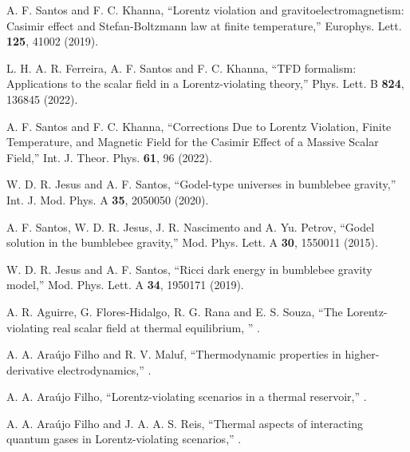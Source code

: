 \documentclass[11pt,showpacs,preprintnumbers,amsmath,amssymb,prd,nofootinbib,superscriptaddress]{revtex4-2}
\begin{document}
\begin{thebibliography}{99}
 A. F. Santos and F. C. Khanna, ``Lorentz violation and gravitoelectromagnetism: Casimir effect and Stefan-Boltzmann law at finite temperature,''  {Europhys. Lett. \textbf{125}, 41002 (2019)}.

 L. H. A. R. Ferreira, A. F. Santos and F. C. Khanna, ``TFD formalism: Applications to the scalar field in a Lorentz-violating theory,''  {Phys. Lett. B \textbf{824}, 136845 (2022)}.

 A. F. Santos and F. C. Khanna, ``Corrections Due to Lorentz Violation, Finite Temperature, and Magnetic Field for the Casimir Effect of a Massive Scalar Field,''  {Int. J. Theor. Phys. \textbf{61}, 96 (2022)}.

 W. D. R. Jesus and A. F. Santos, ``Godel-type universes in bumblebee gravity,''  {Int. J. Mod. Phys. A \textbf{35}, 2050050 (2020)}.

 A. F. Santos, W. D. R. Jesus, J. R. Nascimento and A. Yu. Petrov, ``Godel solution in the bumblebee gravity,''  {Mod. Phys. Lett. A \textbf{30}, 1550011 (2015)}.

 W. D. R. Jesus and A. F. Santos, ``Ricci dark energy in bumblebee gravity model,''  {Mod. Phys. Lett. A \textbf{34}, 1950171 (2019)}.

 A. R. Aguirre, G. Flores-Hidalgo, R. G. Rana and E. S. Souza, ``The Lorentz-violating real scalar field at thermal equilibrium, '' .

 A. A. Ara\'{u}jo Filho and R. V. Maluf, ``Thermodynamic properties in higher-derivative electrodynamics,'' .

 A. A. Ara\'{u}jo Filho, ``Lorentz-violating scenarios in a thermal reservoir,'' .

 A. A. Ara\'{u}jo Filho and J. A. A. S. Reis, ``Thermal aspects of interacting quantum gases in Lorentz-violating scenarios,'' .


\end{thebibliography}
\end{document}
